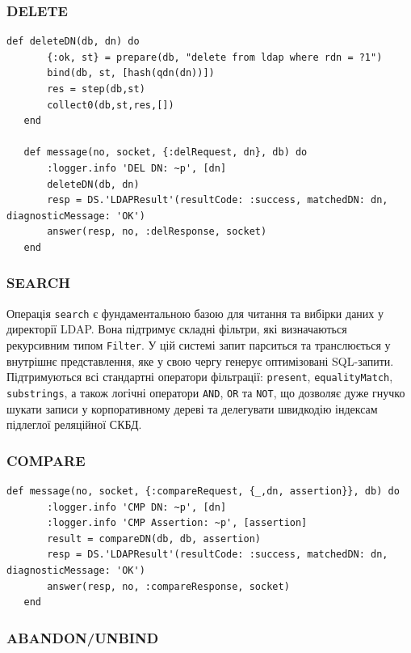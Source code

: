 \subsubsection{DELETE}

\begin{lstlisting}
def deleteDN(db, dn) do
       {:ok, st} = prepare(db, "delete from ldap where rdn = ?1")
       bind(db, st, [hash(qdn(dn))])
       res = step(db,st)
       collect0(db,st,res,[])
   end

   def message(no, socket, {:delRequest, dn}, db) do
       :logger.info 'DEL DN: ~p', [dn]
       deleteDN(db, dn)
       resp = DS.'LDAPResult'(resultCode: :success, matchedDN: dn, diagnosticMessage: 'OK')
       answer(resp, no, :delResponse, socket)
   end
\end{lstlisting}

\subsubsection{SEARCH}

Операція \texttt{search} є фундаментальною базою для читання та вибірки даних у директорії LDAP. Вона підтримує складні фільтри, які визначаються рекурсивним типом \texttt{Filter}. У цій системі запит парситься та транслюється у внутрішнє представлення, яке у свою чергу генерує оптимізовані SQL-запити. Підтримуються всі стандартні оператори фільтрації: \texttt{present}, \texttt{equalityMatch}, \texttt{substrings}, а також логічні оператори \texttt{AND}, \texttt{OR} та \texttt{NOT}, що дозволяє дуже гнучко шукати записи у корпоративному дереві та делегувати швидкодію індексам підлеглої реляційної СКБД.

\subsubsection{COMPARE}

\begin{lstlisting}
def message(no, socket, {:compareRequest, {_,dn, assertion}}, db) do
       :logger.info 'CMP DN: ~p', [dn]
       :logger.info 'CMP Assertion: ~p', [assertion]
       result = compareDN(db, db, assertion)
       resp = DS.'LDAPResult'(resultCode: :success, matchedDN: dn, diagnosticMessage: 'OK')
       answer(resp, no, :compareResponse, socket)
   end
\end{lstlisting}

\subsubsection{ABANDON/UNBIND}

